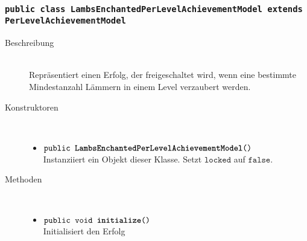 \subsubsection{\normalfont \texttt{public class \textbf{LambsEnchantedPerLevelAchievementModel} extends PerLevelAchievementModel}}

\begin{description}
\item[Beschreibung] \hfill \\ Repräsentiert einen Erfolg, der freigeschaltet wird, wenn eine bestimmte Mindestanzahl Lämmern in einem Level verzaubert werden.
	
\item[Konstruktoren] \hfill \\
	\vspace{-.8cm}
	\begin{itemize}
		\item $\texttt{public \textbf{LambsEnchantedPerLevelAchievementModel}()}$ \\ Instanziiert ein Objekt dieser Klasse. Setzt $\texttt{locked}$ auf $\texttt{false}$.
	\end{itemize}
	
\item[Methoden] \hfill \\
	\vspace{-.8cm}
	\begin{itemize}
				\item $\texttt{public void \textbf{initialize}()}$ \\ Initialisiert den Erfolg
		

\end{itemize}
\end{description}
